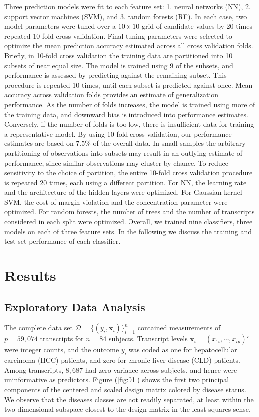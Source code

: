 \documentclass[a4paper]{article}
\begin{document}
Three prediction models were fit to each feature set: 1. neural networks (NN), 2. support vector machines (SVM), and 3. random forests (RF). In each case, two model parameters were tuned over a $10 \times 10$ grid of candidate values by 20-times repeated 10-fold cross validation. Final tuning parameters were selected to optimize the mean prediction accuracy estimated across all cross validation folds. Briefly, in 10-fold cross validation the training data are partitioned into 10 subsets of near equal size. The model is trained using 9 of the subsets, and performance is assessed by predicting against the remaining subset. This procedure is repeated 10-times, until each subset is predicted against once. Mean accuracy across validation folds provides an estimate of generalization performance. As the number of folds increases, the model is trained using more of the training data, and downward bias is introduced into performance estimates. Conversely, if the number of folds is too low, there is insufficient data for training a representative model. By using 10-fold cross validation, our performance estimates are based on $7.5\%$ of the overall data. In small samples the arbitrary partitioning of observations into subsets may result in an outlying estimate of performance, since similar observations may cluster by chance. To reduce sensitivity to the choice of partition, the entire 10-fold cross validation procedure is repeated 20 times, each using a different partition. For NN, the learning rate and the architecture of the hidden layers were optimized. For Gaussian kernel SVM, the cost of margin violation and the concentration parameter were optimized. For random forests, the number of trees and the number of transcripts considered in each split were optimized. Overall, we trained nine classifiers, three models on each of three feature sets. In the following we discuss the training and test set performance of each classifier. 

\section{Results}

\subsection{Exploratory Data Analysis}
The complete data set $\mathcal{D} = \{(y_{i},\bm{x}_{i})\}_{i=1}^{n}$ contained measurements of $p=59,074$ transcripts for $n = 84$ subjects. Transcript levels $\bm{x}_{i}=({x}_{1i},\cdots,x_{ip})'$ were integer counts, and the outcome $y_{i}$ was coded as one for hepatocellular carcinoma (HCC) patients, and zero for chronic liver disease (CLD) patients. Among transcripts, $8,687$ had zero variance across subjects, and hence were uninformative as predictors. Figure (\ref{fig:01}) shows the first two principal components of the centered and scaled design matrix colored by disease status. We observe that the diseases classes are not readily separated, at least within the two-dimensional subspace closest to the design matrix in the least squares sense. 
\end{document}
